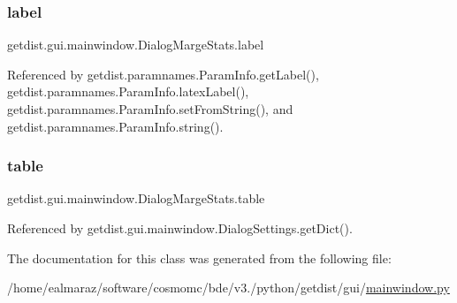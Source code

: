 \subsubsection{\texorpdfstring{label}{label}}
{\footnotesize\ttfamily getdist.\+gui.\+mainwindow.\+Dialog\+Marge\+Stats.\+label}



Referenced by getdist.\+paramnames.\+Param\+Info.\+get\+Label(), getdist.\+paramnames.\+Param\+Info.\+latex\+Label(), getdist.\+paramnames.\+Param\+Info.\+set\+From\+String(), and getdist.\+paramnames.\+Param\+Info.\+string().

\mbox{\label{classgetdist_1_1gui_1_1mainwindow_1_1DialogMargeStats_abc2df1b9a20b079d9b400f89a4a9a845}} 
\subsubsection{\texorpdfstring{table}{table}}
{\footnotesize\ttfamily getdist.\+gui.\+mainwindow.\+Dialog\+Marge\+Stats.\+table}



Referenced by getdist.\+gui.\+mainwindow.\+Dialog\+Settings.\+get\+Dict().



The documentation for this class was generated from the following file\+:\begin{DoxyCompactItemize}
\item 
/home/ealmaraz/software/cosmomc/bde/v3./python/getdist/gui/\mbox{\hyperlink{mainwindow_8py}{mainwindow.\+py}}\end{DoxyCompactItemize}
